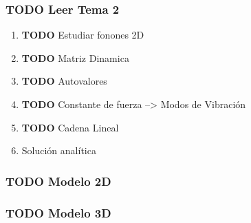 \documentclass[11pt]{article}
\begin{document}
\subsubsection{{\bfseries\sffamily TODO} Leer Tema 2}
\label{sec:orgbcd546e}
\begin{enumerate}
\item {\bfseries\sffamily TODO} Estudiar fonones 2D
\label{sec:org10ec0be}
\item {\bfseries\sffamily TODO} Matriz Dinamica
\label{sec:org2b320b0}
\item {\bfseries\sffamily TODO} Autovalores
\label{sec:orgc54bedc}
\item {\bfseries\sffamily TODO} Constante de fuerza --> Modos de Vibración
\label{sec:org0ed74d0}
\item {\bfseries\sffamily TODO} Cadena Lineal
\label{sec:orgdc88b3a}
\item Solución analítica
\label{sec:org5535ce1}
\end{enumerate}
\subsubsection{{\bfseries\sffamily TODO} Modelo 2D}
\label{sec:org3524c5f}
\subsubsection{{\bfseries\sffamily TODO} Modelo 3D}
\label{sec:orga807167}
\end{document}
